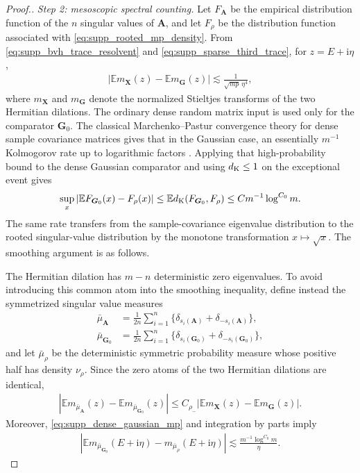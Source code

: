 \documentclass[numsec,webpdf,modern,large,namedate]{oup-authoring-template}
\theoremstyle{plain}
\theoremstyle{remark}
\newif\ifmarkchanges
\newenvironment{revision}{\begingroup\ifmarkchanges\color{red}\fi}{\endgroup}
\begin{document}
\begin{revision}
\begin{proof}[Proof.]
\textit{Step 2: mesoscopic spectral counting.}
Let $F_{\bm A}$ be the empirical distribution function of the $n$ singular
values of $\bm A$, and let $F_\rho$ be the distribution function associated
with \eqref{eq:supp_rooted_mp_density}.  From
\eqref{eq:supp_bvh_trace_resolvent} and
\eqref{eq:supp_sparse_third_trace}, for $z=E+\mathrm{i}\eta$,
\begin{align}
\label{eq:supp_sparse_stieltjes_compare}
    \left|
    \mathbb E m_{\bm X}(z)-\mathbb E m_{\bm G}(z)
    \right|
    \lesssim\frac{1}{\sqrt{mp}\,\eta^4},
\end{align}
where $m_{\bm X}$ and $m_{\bm G}$ denote the normalized Stieltjes transforms
of the two Hermitian dilations.  The ordinary dense random matrix input is used only for the comparator
$\bm G_0$.  The classical Marchenko--Pastur convergence theory for dense
sample covariance matrices gives that in the Gaussian case, an essentially
$m^{-1}$ Kolmogorov rate up to logarithmic factors \citep{gotze2011rate}.  Applying that high-probability bound to the dense
Gaussian comparator and using $d_{\rm K}\le1$ on the exceptional event gives
\begin{align}
\label{eq:supp_dense_gaussian_mp}
    \sup_x\left|\mathbb E F_{\bm G_0}(x)-F_\rho(x)\right|
    \le \mathbb E d_{\rm K}(F_{\bm G_0},F_\rho)
    \le C m^{-1}\log^{C_0}m.
\end{align}
The same rate transfers from the sample-covariance eigenvalue distribution to
the rooted singular-value distribution by the monotone transformation
$x\mapsto\sqrt{x}$.  The smoothing argument is as follows.

The Hermitian dilation has $m-n$ deterministic zero eigenvalues.  To avoid
introducing this common atom into the smoothing inequality, define instead
the symmetrized singular value measures
\begin{align*}
    \bar\mu_{\bm A}
    &=\frac1{2n}\sum_{i=1}^n
      \{\delta_{s_i(\bm A)}+\delta_{-s_i(\bm A)}\},\\
    \bar\mu_{\bm G_0}
    &=\frac1{2n}\sum_{i=1}^n
      \{\delta_{s_i(\bm G_0)}+\delta_{-s_i(\bm G_0)}\},
\end{align*}
and let $\bar\mu_\rho$ be the deterministic symmetric probability measure
whose positive half has density $\nu_\rho$.  Since the zero atoms of the two
Hermitian dilations are identical,
\begin{align}
\label{eq:supp_sym_stieltjes_conversion}
    \left|
    \mathbb E m_{\bar\mu_{\bm A}}(z)
    -\mathbb E m_{\bar\mu_{\bm G_0}}(z)
    \right|
    \le C_{\rho_-}
    \left|
    \mathbb E m_{\bm X}(z)-\mathbb E m_{\bm G}(z)
    \right|.
\end{align}
Moreover, \eqref{eq:supp_dense_gaussian_mp} and integration by parts imply
\begin{align}
\label{eq:supp_dense_gaussian_stieltjes_mp}
    \left|
    \mathbb E m_{\bar\mu_{\bm G_0}}(E+\mathrm i\eta)
    -m_{\bar\mu_\rho}(E+\mathrm i\eta)
    \right|
    \lesssim \frac{m^{-1}\log^{C_0}m}{\eta}.
\end{align}


\end{proof}
\end{revision}
\end{document}
